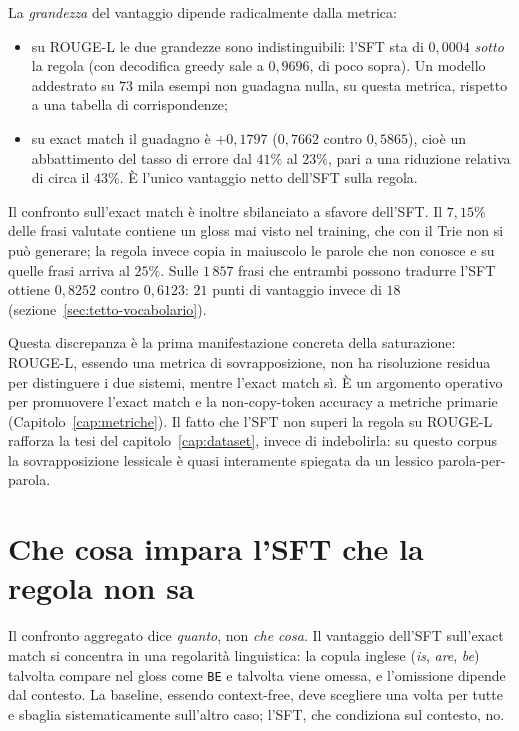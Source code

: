 La \emph{grandezza} del vantaggio dipende radicalmente dalla metrica:

\begin{itemize}
  \item su ROUGE-L le due grandezze sono indistinguibili: l'SFT sta di
        $0{,}0004$ \emph{sotto} la regola (con decodifica greedy sale a
        $0{,}9696$, di poco sopra). Un modello addestrato su $73$ mila esempi
        non guadagna nulla, su questa metrica, rispetto a una tabella di
        corrispondenze;
  \item su exact match il guadagno è $+0{,}1797$ ($0{,}7662$ contro
        $0{,}5865$), cioè un abbattimento del tasso di errore dal $41\%$ al
        $23\%$, pari a una riduzione relativa di circa il $43\%$. È l'unico
        vantaggio netto dell'SFT sulla regola.
\end{itemize}

Il confronto sull'exact match è inoltre sbilanciato a sfavore dell'SFT. Il
$7{,}15\%$ delle frasi valutate contiene un gloss mai visto nel training, che con
il Trie non si può generare; la regola invece copia in maiuscolo le parole che non
conosce e su quelle frasi arriva al $25\%$. Sulle $1\,857$ frasi che entrambi
possono tradurre l'SFT ottiene $0{,}8252$ contro $0{,}6123$: $21$ punti di
vantaggio invece di $18$ (sezione~\ref{sec:tetto-vocabolario}).

Questa discrepanza è la prima manifestazione concreta della saturazione:
ROUGE-L, essendo una metrica di sovrapposizione, non ha risoluzione residua per
distinguere i due sistemi, mentre l'exact match sì. È un argomento operativo per
promuovere l'exact match e la non-copy-token accuracy a metriche primarie
(Capitolo~\ref{cap:metriche}). Il fatto che l'SFT non superi la regola su
ROUGE-L rafforza la tesi del capitolo~\ref{cap:dataset}, invece di indebolirla:
su questo corpus la sovrapposizione lessicale è quasi interamente spiegata da un
lessico parola-per-parola.

\section{Che cosa impara l'SFT che la regola non sa}
\label{sec:sft-vs-regola-analisi}

Il confronto aggregato dice \emph{quanto}, non \emph{che cosa}. Il vantaggio
dell'SFT sull'exact match si concentra in una regolarità linguistica: la copula
inglese (\emph{is}, \emph{are}, \emph{be}) talvolta compare nel gloss come
\texttt{BE} e talvolta viene omessa, e l'omissione dipende dal contesto. La
baseline, essendo context-free, deve scegliere una volta per tutte e sbaglia
sistematicamente sull'altro caso; l'SFT, che condiziona sul contesto, no.

